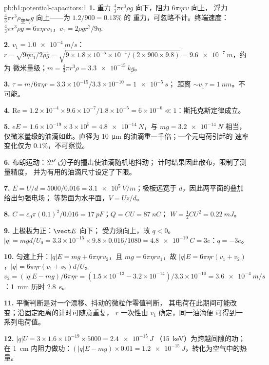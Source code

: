 \begin{solution}{pb:b1:potential-capacitors:1}
\textbf{1.} 重力 $\tfrac43\pi r^3\rho g$ 向下，阻力 $6\pi\eta rv$ 向上，
浮力 $\tfrac43\pi r^3\rho_{\text{空气}}g$ 向上——为 $1.2/900 = 0.13\%$ 的
重力，可忽略不计。终端速度：$\tfrac43\pi r^3\rho g = 6\pi\eta rv_1$，$v_1 =
2\rho gr^2/9\eta$.

\textbf{2.} $v_1 = \qty{1.0e-4}{m/s}$：$r = \sqrt{9\eta v_1/2\rho g} = \sqrt{9 \times
1.8 \times 10^{-5} \times 10^{-4}/(2 \times 900 \times 9.8)} = \qty{9.6e-7}{m}$，约为
微米量级；$m = \tfrac43\pi r^3\rho = \qty{3.3e-15}{kg}$。

\textbf{3.} $\tau = m/6\pi\eta r = 3.3 \times 10^{-15}/3.3 \times 10^{-10} = \qty{1e-5}{s}$；
距离 $\sim v_1\tau = \qty{1}{nm}$。不可能。

\textbf{4.} $\mathrm{Re} = 1.2 \times 10^{-4} \times 9.6 \times 10^{-7}/1.8 \times 10^{-5} =
6 \times 10^{-6} \ll 1$：斯托克斯定律成立。

\textbf{5.} $eE = 1.6 \times 10^{-19} \times 3 \times 10^5 = \qty{4.8e-14}{N}$，与
$mg = \qty{3.2e-14}{N}$ 相当，仅微米量级的油滴如此。直径为 \qty{10}{\micro m}
的油滴重一千倍；一个元电荷引起的
速率变化仅为 $0.1\%$，不可察觉。

\textbf{6.} 布朗运动：空气分子的撞击使油滴随机地抖动；
计时结果因此散布，限制了测量精度，
并为有用的油滴尺寸设定了下限。

\textbf{7.} $E = U/d = 5000/0.016 = \qty{3.1e5}{V/m}$；极板远宽于
$d$，因此两平面的叠加给出匀强电场；
等势面为水平面，$V = Uz/d$。

\textbf{8.} $C = \varepsilon_0\pi(0.1)^2/0.016 = \qty{17}{pF}$；$Q = CU = \qty{87}{nC}$；
$W = \tfrac12CU^2 = \qty{0.22}{mJ}$。

\textbf{9.} 上极板为正：$\vect E$ 向下；
受力须向上，故 $q < 0$。$|q| = mgd/U_0 = 3.3 \times 10^{-15} \times 9.8 \times 0.016/
1080 = \qty{4.8e-19}{C} = 3e$：$q = -3e$。

\textbf{10.} 匀速上升：$|q|E = mg + 6\pi\eta rv_2$，且 $mg =
6\pi\eta rv_1$，故 $|q|E = 6\pi\eta r(v_1 + v_2)$，$|q| = 6\pi\eta r(v_1 +
v_2)d/U$。$v_2 = (|q|E - mg)/6\pi\eta r = (1.5 \times 10^{-13} - 3.2 \times 10^{-14})/
3.3 \times 10^{-10} = \qty{3.6e-4}{m/s}$：\qty{1}{mm} 历时 \qty{2.8}{s}。

\textbf{11.} 平衡判断是对一个漂移、抖动的微粒作零值判断，
其电荷在此期间可能改变；沿固定距离的计时可随意重复，
$r$ 一次性由 $v_1$ 确定，同一油滴便
可得到一系列电荷值。

\textbf{12.} $|q|U = 3 \times 1.6 \times 10^{-19} \times 5000 = \qty{2.4e-15}{J}$
（\qty{15}{keV}）为跨越间隙的功；在 \qty{1}{cm} 内阻力做功：$(|q|E - mg) \times 0.01 =
\qty{1.2e-15}{J}$，转化为空气中的热量。


\end{solution}
